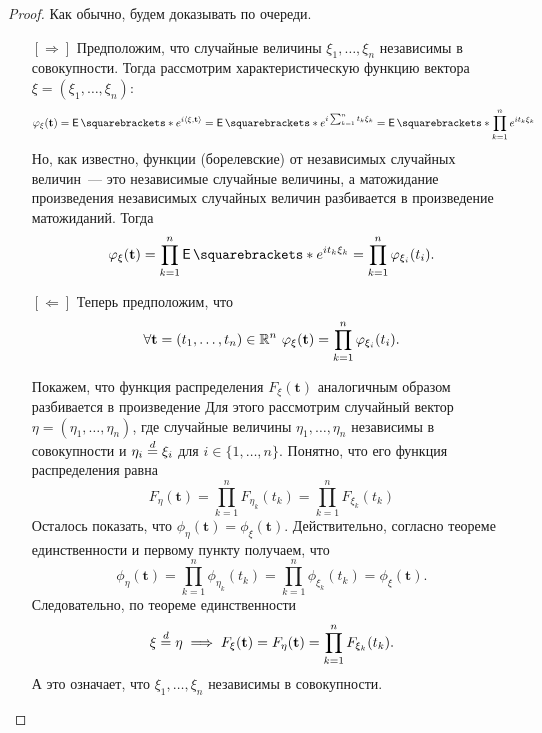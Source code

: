 \begin{proof}
	Как обычно, будем доказывать по очереди.
	\begin{itemize}
		\item[{\([\Rightarrow]\)}] Предположим, что случайные величины 
		\(\xi_{1}, \dots, \xi_{n}\) независимы в совокупности. Тогда рассмотрим 
		характеристическую функцию вектора \(\xi = (\xi_1, \dots, \xi_n)\):
		\[
			\phi_{\xi}(\mathbf{t}) = \E{e^{i\left\langle\xi, 
			\mathbf{t}\right\rangle}} = \E{e^{i\sum_{k = 1}^{n} t_k\xi_k}} = 
			\E{\prod_{k = 1}^{n} e^{it_k\xi_{k}}}
		\]
		Но, как известно, функции (борелевские) от независимых случайных 
		величин~--- это независимые случайные величины, а матожидание 
		произведения независимых случайных величин разбивается в произведение 
		матожиданий. Тогда
		\[
			\phi_{\xi}(\mathbf{t}) = \prod_{k = 1}^{n} \E{e^{it_k\xi_{k}}} = 
			\prod_{k = 1}^{n} \phi_{\xi_i}(t_i).
		\]
		
		\item[{\([\Leftarrow]\)}] Теперь предположим, что
		\[
			\forall \mathbf{t} = (t_1, \dots, t_n) \in \R^n\ 
			\phi_{\xi}(\mathbf{t}) = \prod_{k = 1}^{n} \phi_{\xi_i}(t_i).
		\]
		
		Покажем, что функция распределения \(F_{\xi}(\mathbf{t})\) аналогичным 
		образом разбивается в произведение Для этого рассмотрим случайный 
		вектор \(\eta = (\eta_1, \dots, \eta_n)\), где случайные величины 
		\(\eta_1, \dots, \eta_n\) независимы в совокупности и \(\eta_{i} 
		\overset{d}{=} \xi_{i}\) для \(i \in \{1, \dots, n\}\). Понятно, что его 
		функция распределения равна
		\[
			F_{\eta}(\mathbf{t}) = \prod_{k = 1}^{n} F_{\eta_k}(t_k) = \prod_{k 
			= 1}^{n} F_{\xi_k}(t_k)
		\]
		Осталось показать, что \(\phi_{\eta}(\mathbf{t}) = 
		\phi_{\xi}(\mathbf{t})\). Действительно, согласно теореме 
		единственности и первому пункту получаем, что
		\[
			\phi_{\eta}(\mathbf{t}) = \prod_{k = 1}^{n} \phi_{\eta_k}(t_k) = 
			\prod_{k = 1}^{n} \phi_{\xi_k}(t_k) = \phi_{\xi}(\mathbf{t}).
		\]
		Следовательно, по теореме единственности
		\[
			\xi \overset{d}{=} \eta \implies F_{\xi}(\mathbf{t}) = 
			F_{\eta}(\mathbf{t}) = \prod_{k = 1}^{n} F_{\xi_k}(t_k).
		\]
		А это означает, что \(\xi_{1}, \dots, \xi_{n}\) независимы в 
		совокупности.
	\end{itemize}
\end{proof}

